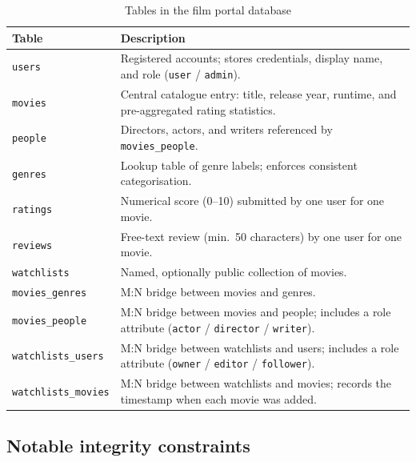 \documentclass[11pt, a4paper]{article}
\begin{document}
\begin{table}[H]
    \centering
    \caption{Tables in the film portal database}
    \label{tab:tables}
    \begin{tabular}{l p{9cm}}
        \toprule
        \textbf{Table} & \textbf{Description} \\
        \midrule
        \texttt{users}
            & Registered accounts; stores credentials, display name, and
              role (\texttt{user} / \texttt{admin}). \\
        \texttt{movies}
            & Central catalogue entry: title, release year, runtime, and
              pre-aggregated rating statistics. \\
        \texttt{people}
            & Directors, actors, and writers referenced by
              \texttt{movies\_people}. \\
        \texttt{genres}
            & Lookup table of genre labels; enforces consistent
              categorisation. \\
        \texttt{ratings}
            & Numerical score (0--10) submitted by one user for one movie. \\
        \texttt{reviews}
            & Free-text review (min.\ 50 characters) by one user for one
              movie. \\
        \texttt{watchlists}
            & Named, optionally public collection of movies. \\
        \texttt{movies\_genres}
            & M:N bridge between movies and genres. \\
        \texttt{movies\_people}
            & M:N bridge between movies and people; includes a role
              attribute (\texttt{actor} / \texttt{director} /
              \texttt{writer}). \\
        \texttt{watchlists\_users}
            & M:N bridge between watchlists and users; includes a role
              attribute (\texttt{owner} / \texttt{editor} /
              \texttt{follower}). \\
        \texttt{watchlists\_movies}
            & M:N bridge between watchlists and movies; records the
              timestamp when each movie was added. \\
        \bottomrule
    \end{tabular}
\end{table}

\subsection{Notable integrity constraints}
\end{document}
